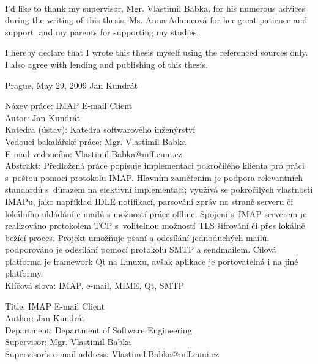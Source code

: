 \documentclass[12pt,notitlepage]{report}
\begin{document}
\normalsize
\setcounter{page}{2}
\ \vspace{10mm} 

\noindent I'd like to thank my supervisor, Mgr. Vlastimil Babka, for his
numerous advices during the writing of this thesis, Ms. Anna Adamcová for her
great patience and support, and my parents for supporting my studies.

\vspace{\fill}
\noindent I hereby declare that I wrote this thesis myself using the referenced
sources only. I also agree with lending and publishing of this thesis.

\vspace{5mm}
\bigskip
\noindent Prague, May 29, 2009 \hspace{\fill}Jan Kundrát\\

\tableofcontents

\newpage

\noindent
Název práce: IMAP E-mail Client\\
Autor: Jan Kundrát\\
Katedra (ústav): Katedra softwarového inženýrství\\
Vedoucí bakalářské práce: Mgr. Vlastimil Babka\\
E-mail vedoucího: Vlastimil.Babka@mff.cuni.cz\\

\noindent Abstrakt:  Předložená práce popisuje implementaci pokročilého klienta
pro práci s~poštou pomocí protokolu IMAP.  Hlavním zaměřením je podpora
relevantních standardů s~důrazem na efektivní implementaci; využívá se
pokročilých vlastností IMAPu, jako například IDLE notifikací, parsování zpráv na
straně serveru či lokálního ukládání e-mailů s možností práce offline.  Spojení
s~IMAP serverem je realizováno protokolem TCP s~volitelnou možností TLS
šifrování či přes lokálně bežící proces.  Projekt umožňuje psaní a odesílání
jednoduchých mailů, podporováno je odesílání pomocí protokolu SMTP a sendmailem.
Cílová platforma je framework Qt na Linuxu, avšak aplikace je portovatelná i na
jiné platformy.\\

\noindent Klíčová slova: IMAP, e-mail, MIME, Qt, SMTP

\vspace{10mm}

\noindent
Title: IMAP E-mail Client\\
Author: Jan Kundrát\\
Department: Department of Software Engineering\\
Supervisor: Mgr. Vlastimil Babka\\
Supervisor's e-mail address: Vlastimil.Babka@mff.cuni.cz\\
\end{document}
